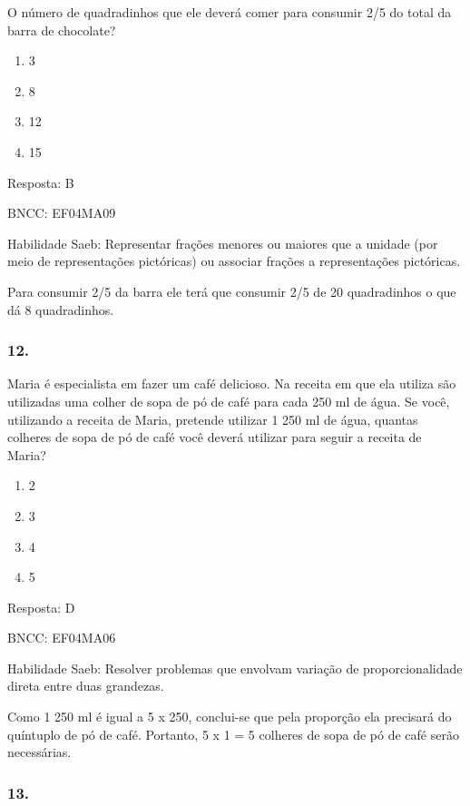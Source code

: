 O número de quadradinhos que ele deverá comer para consumir 2/5 do total
da barra de chocolate?

\begin{enumerate}
\def\labelenumi{\alph{enumi})}
\item
  3
\item
  8
\item
  12
\item
  15
\end{enumerate}

Resposta: B

BNCC: EF04MA09

Habilidade Saeb: Representar frações menores ou maiores que a unidade
(por meio de representações pictóricas) ou associar frações a
representações pictóricas.

Para consumir 2/5 da barra ele terá que consumir 2/5 de 20 quadradinhos
o que dá 8 quadradinhos.

\subsubsection{12.}\label{section-168}

Maria é especialista em fazer um café delicioso. Na receita em que ela
utiliza são utilizadas uma colher de sopa de pó de café para cada 250 ml
de água. Se você, utilizando a receita de Maria, pretende utilizar 1 250
ml de água, quantas colheres de sopa de pó de café você deverá utilizar
para seguir a receita de Maria?

\begin{enumerate}
\def\labelenumi{\alph{enumi})}
\item
  2
\item
  3
\item
  4
\item
  5
\end{enumerate}

Resposta: D

BNCC: EF04MA06

Habilidade Saeb: Resolver problemas que envolvam variação de
proporcionalidade direta entre duas grandezas.

Como 1 250 ml é igual a 5 x 250, conclui-se que pela proporção ela
precisará do quíntuplo de pó de café. Portanto, 5 x 1 = 5 colheres de
sopa de pó de café serão necessárias.

\subsubsection{13.}\label{section-169}

